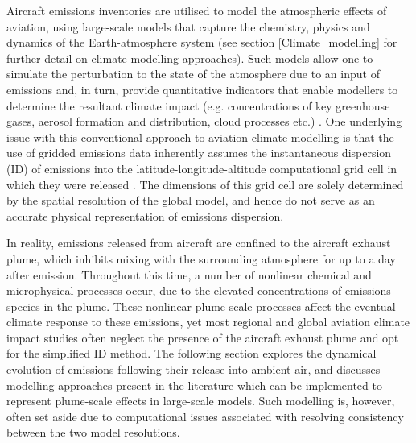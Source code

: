 Aircraft emissions inventories are utilised to model the atmospheric effects of aviation, using large-scale models that capture the chemistry, physics and dynamics of the Earth-atmosphere system (see section \ref{Climate_modelling} for further detail on climate modelling approaches). Such models allow one to simulate the perturbation to the state of the atmosphere due to an input of emissions and, in turn, provide quantitative indicators that enable modellers to determine the resultant climate impact (e.g. concentrations of key greenhouse gases, aerosol formation and distribution, cloud processes etc.) \cite{Jacobson2005}. One underlying issue with this conventional approach to aviation climate modelling is that the use of gridded emissions data inherently assumes the instantaneous dispersion (ID) of emissions into the latitude-longitude-altitude computational grid cell in which they were released \cite{Petry1998}. The dimensions of this grid cell are solely determined by the spatial resolution of the global model, and hence do not serve as an accurate physical representation of emissions dispersion.

In reality, emissions released from aircraft are confined to the aircraft exhaust plume, which inhibits mixing with the surrounding atmosphere for up to a day after emission. Throughout this time, a number of nonlinear chemical and microphysical processes occur, due to the elevated concentrations of emissions species in the plume. These nonlinear plume-scale processes affect the eventual climate response to these emissions, yet most regional and global aviation climate impact studies \cite{Cariolle2009} often neglect the presence of the aircraft exhaust plume and opt for the simplified ID method. The following section explores the dynamical evolution of emissions following their release into ambient air, and discusses modelling approaches present in the literature which can be implemented to represent plume-scale effects in large-scale models. Such modelling is, however, often set aside due to computational issues associated with resolving consistency between the two model resolutions.